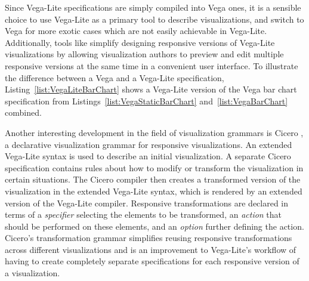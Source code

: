 Since Vega-Lite specifications are simply compiled into Vega ones, it
is a sensible choice to use Vega-Lite as a primary tool to describe
visualizations, and switch to Vega for more exotic cases which are not
easily achievable in Vega-Lite. Additionally, tools like
\textcite{TechniquesForFlexibleRespVisDesign} simplify designing
responsive versions of Vega-Lite visualizations by allowing
visualization authors to preview and edit multiple responsive versions
at the same time in a convenient user interface. To illustrate the
difference between a Vega and a Vega-Lite specification,
Listing~\ref{list:VegaLiteBarChart} shows a Vega-Lite version of the
Vega bar chart specification from
Listings~\ref{list:VegaStaticBarChart} and~\ref{list:VegaBarChart}
combined.


\begin{samepage}
%
A Vega-Lite specification of the Vega bar chart shown in
Listings~\ref{list:VegaStaticBarChart} and~\ref{list:VegaBarChart}
combined.
},
]{listings/vega-lite-bar-chart.json}
\end{samepage}



Another interesting development in the field of visualization grammars
is Cicero \parencite{Cicero}, a declarative visualization grammar for
responsive visualizations. An extended Vega-Lite syntax is used to
describe an initial visualization. A separate Cicero specification
contains rules about how to modify or transform the visualization in
certain situations. The Cicero compiler then creates a transformed
version of the visualization in the extended Vega-Lite syntax, which
is rendered by an extended version of the Vega-Lite compiler.
%
Responsive transformations are declared in terms of a \emph{specifier}
selecting the elements to be transformed, an \emph{action} that should
be performed on these elements, and an \emph{option} further defining
the action. Cicero's transformation grammar simplifies reusing
responsive transformations across different visualizations and is an
improvement to Vega-Lite's workflow of having to create completely
separate specifications for each responsive version of a
visualization.






